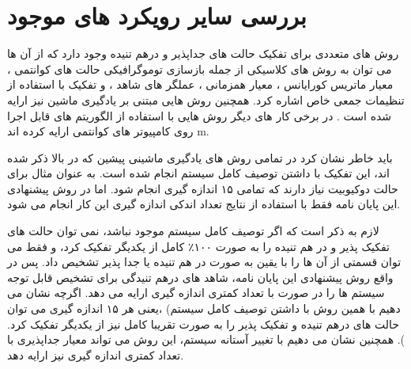 \section{بررسی سایر رویکرد های موجود}

روش های متعددی برای تفکیک حالت های جداپذیر و درهم تنیده وجود دارد که از آن ها می توان به روش های کلاسیکی از جمله بازسازی توموگرافیکی
حالت های کوانتمی
\cite{Lu2016}،
معیار ماتریس کورایانس
\cite{Guhne2007}،
معیار همزمانی
\cite{Wootters1998,Rungta2001,DeVicente2007}،
عملگر های شاهد
\cite{horodecki_1996,Terhal2000}،
و تفکیک با استفاده از تنظیمات جمعی خاص
\cite{Pezze2016}
اشاره کرد.
همچنین روش هایی مبتنی بر یادگیری ماشین نیز ارایه شده است
\cite{Wisniewska2015,Gao2018,Ma2018,Lu2018,Gray2018,Deng2018,Levine2018,Liu2018,Qiu2019}.
در برخی کار های دیگر روش هایی با استفاده از الگوریتم های قابل اجرا روی کامپیوتر های کوانتمی ارایه کرده اند
m\cite{Cai2015,behrman2002}.

باید خاطر نشان کرد در تمامی روش های یادگیری ماشینی پیشین که در بالا ذکر شده اند، این تفکیک با داشتن توصیف کامل سیستم انجام شده است. به عنوان مثال برای حالت دوکیوبیت نیاز دارند که تمامی
۱۵
اندازه گیری انجام شود.
اما در روش پیشنهادی این پایان نامه فقط با استفاده از نتایج تعداد اندکی اندازه گیری این کار انجام می شود.

لازم به ذکر است که اگر توصیف کامل سیستم موجود نباشد، نمی توان حالت های تفکیک پذیر و در هم تنیده را به صورت
۱۰۰٪
کامل از یکدیگر تفکیک کرد، و فقط می توان قسمتی از آن ها را با یقین به صورت در هم تنیده یا جدا پذیر تشخیص داد. پس در واقع روش پیشنهادی این پایان نامه، شاهد های درهم تنیدگی برای تشخیص قابل توجه سیستم ها را در صورت با تعداد کمتری اندازه گیری ارایه می دهد. اگرچه نشان می دهیم با همین روش با داشتن توصیف کامل سیستم)
،یعنی هر ۱۵ اندازه گیری
می توان حالت های درهم تنیده و تفکیک پذیر را به صورت تقریبا کامل نیز از یکدیگر تفکیک کرد.
).
همچنین نشان می دهیم با تغییر آستانه
سیستم، این روش می تواند معیار جداپذیری
با تعداد کمتری اندازه گیری نیز ارایه دهد.
